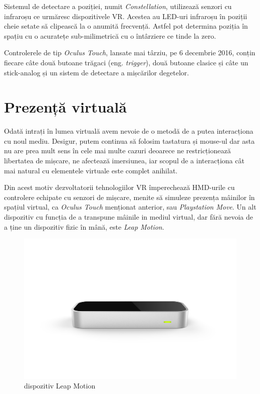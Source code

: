 Sistemul de detectare a poziției, numit \textit{Constellation}, utilizează senzori cu infraroșu ce urmăresc dispozitivele VR. Acestea au LED-uri infraroșu în poziții cheie setate să clipească la o anumită frecvență. Astfel pot determina poziția în spațiu cu o acuratețe sub-milimetrică cu o întârziere ce tinde la zero.

Controlerele de tip \textit{Oculus Touch}, lansate mai târziu, pe 6 decembrie 2016, conțin fiecare câte două butoane trăgaci (eng. \textit{trigger}), două butoane clasice și câte un stick-analog și un sistem de detectare a mișcărilor degetelor.


\section{Prezență virtuală}

Odată intrați în lumea virtuală avem nevoie de o metodă de a putea interacționa cu noul mediu. Desigur, putem continua să folosim tastatura și mouse-ul dar asta nu are prea mult sens în cele mai multe cazuri deoarece ne restricționează libertatea de mișcare, ne afectează imersiunea, iar scopul de a interacționa cât mai natural cu elementele virtuale este complet anihilat.

Din acest motiv dezvoltatorii tehnologiilor VR împerechează HMD-urile cu controlere echipate cu senzori de mișcare, menite să simuleze prezența mâinilor în spațiul virtual, ca \textit{Oculus Touch} menționat anterior, sau \textit{Playstation Move}.
Un alt dispozitiv cu funcția de a transpune mâinile in mediul virtual, dar fără nevoia de a ține un dispozitiv fizic în mână, este \textit{Leap Motion}.

\begin{figure}[h]
  \centering
  \includegraphics[scale=0.06]{img/LeapMotion.png}
  \caption{dispozitiv Leap Motion}
\end{figure}

